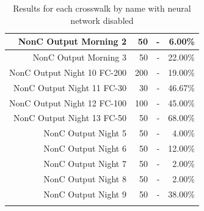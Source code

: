\documentclass[12pt]{ucthesis}
\begin{document}
\begin{longtable}{|r|r|r|r|}
    \hline
    NonC Output Morning 2 & 50    & -     & 6.00\% \bigstrut\\
    \hline
    NonC Output Morning 3 & 50    & -     & 22.00\% \bigstrut\\
    \hline
    NonC Output Night 10 FC-200 & 200   & -     & 19.00\% \bigstrut\\
    \hline
    NonC Output Night 11 FC-30 & 30    & -     & 46.67\% \bigstrut\\
    \hline
    NonC Output Night 12 FC-100 & 100   & -     & 45.00\% \bigstrut\\
    \hline
    NonC Output Night 13 FC-50 & 50    & -     & 68.00\% \bigstrut\\
    \hline
    NonC Output Night 5 & 50    & -     & 4.00\% \bigstrut\\
    \hline
    NonC Output Night 6 & 50    & -     & 12.00\% \bigstrut\\
    \hline
    NonC Output Night 7 & 50    & -     & 2.00\% \bigstrut\\
    \hline
    NonC Output Night 8 & 50    & -     & 2.00\% \bigstrut\\
    \hline
    NonC Output Night 9 & 50    & -     & 38.00\% \bigstrut\\
    \hline

    
    \caption{Results for each crosswalk by name with neural network disabled}
    \label{tab:appendixcrosswalkresultswithoutNeural} 
    \end{longtable}
\end{document}
